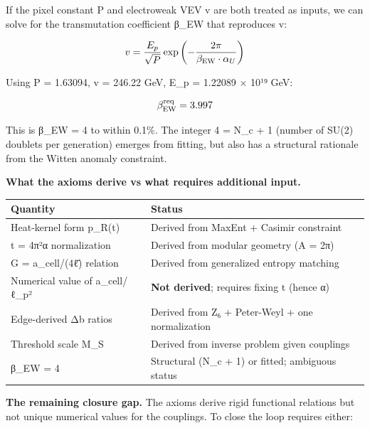 \documentclass[
]{article}
\newcounter{none} %
\begin{document}
If the pixel constant P and electroweak VEV v are both treated as
inputs, we can solve for the transmutation coefficient β\_EW that
reproduces v:

\[
v = \frac{E_p}{\sqrt{P}} \exp\left(-\frac{2\pi}{\beta_{\rm EW} \cdot \alpha_U}\right)
\]

Using P = 1.63094, v = 246.22 GeV, E\_p = 1.22089 × 10¹⁹ GeV:

\[
\beta_{\rm EW}^{\rm req} = 3.997
\]

This is β\_EW = 4 to within 0.1\%. The integer 4 = N\_c + 1 (number of
SU(2) doublets per generation) emerges from fitting, but also has a
structural rationale from the Witten anomaly constraint.

\textbf{What the axioms derive vs what requires additional input.}

{\def\LTcaptype{none} %
\begin{longtable}[]{@{}
  >{\raggedright\arraybackslash}p{}
  >{\raggedright\arraybackslash}p{}@{}}
\toprule\noalign{}
\begin{minipage}[b]{\linewidth}\raggedright
Quantity
\end{minipage} & \begin{minipage}[b]{\linewidth}\raggedright
Status
\end{minipage} \\
\midrule\noalign{}
\endhead
\bottomrule\noalign{}
\endlastfoot
Heat-kernel form p\_R(t) & Derived from MaxEnt + Casimir constraint \\
t = 4π²α normalization & Derived from modular geometry (A = 2π) \\
G = a\_cell/(4ℓ̄) relation & Derived from generalized entropy matching \\
Numerical value of a\_cell/ℓ\_p² & \textbf{Not derived}; requires fixing
t (hence α) \\
Edge-derived Δb ratios & Derived from Z₆ + Peter-Weyl + one
normalization \\
Threshold scale M\_S & Derived from inverse problem given couplings \\
β\_EW = 4 & Structural (N\_c + 1) or fitted; ambiguous status \\
\end{longtable}
}

\textbf{The remaining closure gap.} The axioms derive rigid functional
relations but not unique numerical values for the couplings. To close
the loop requires either:
\end{document}
